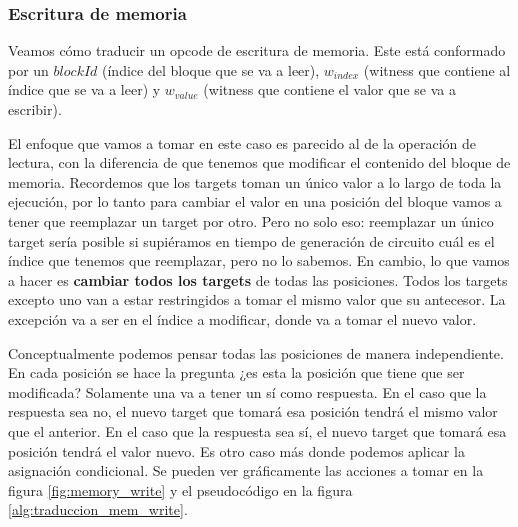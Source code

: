 \subsubsection{\textbf{Escritura de memoria}}
Veamos cómo traducir un opcode de escritura de memoria. Este está conformado por un $blockId$ (índice del bloque que se va a leer), $w_{index}$ (witness que contiene al índice que se va a leer) y $w_{value}$ (witness que contiene el valor que se va a escribir). 

El enfoque que vamos a tomar en este caso es parecido al de la operación de lectura, con la diferencia de que tenemos que modificar el contenido del bloque de memoria. Recordemos que los targets toman un único valor a lo largo de toda la ejecución, por lo tanto para cambiar el valor en una posición del bloque vamos a tener que reemplazar un target por otro. Pero no solo eso: reemplazar un único target sería posible si supiéramos en tiempo de generación de circuito cuál es el índice que tenemos que reemplazar, pero no lo sabemos. En cambio, lo que vamos a hacer es \textbf{cambiar todos los targets} de todas las posiciones. Todos los targets excepto uno van a estar restringidos a tomar el mismo valor que su antecesor. La excepción va a ser en el índice a modificar, donde va a tomar el nuevo valor. 

Conceptualmente podemos pensar todas las posiciones de manera independiente. En cada posición se hace la pregunta ¿es esta la posición que tiene que ser modificada? Solamente una va a tener un sí como respuesta. En el caso que la respuesta sea no, el nuevo target que tomará esa posición tendrá el mismo valor que el anterior. En el caso que la respuesta sea sí, el nuevo target que tomará esa posición tendrá el valor nuevo. Es otro caso más donde podemos aplicar la asignación condicional. Se pueden ver gráficamente las acciones a tomar en la figura \ref{fig:memory_write} y el pseudocódigo en la figura \ref{alg:traduccion_mem_write}.


